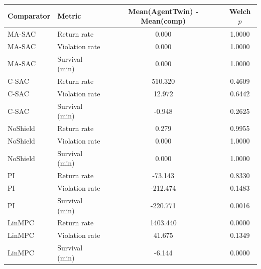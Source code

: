 \begin{tabular}{llcc}
\toprule
Comparator & Metric & Mean(AgentTwin) - Mean(comp) & Welch $p$\\
\midrule
MA-SAC & Return rate & 0.000 & 1.0000\\
MA-SAC & Violation rate & 0.000 & 1.0000\\
MA-SAC & Survival (min) & 0.000 & 1.0000\\
C-SAC & Return rate & 510.320 & 0.4609\\
C-SAC & Violation rate & 12.972 & 0.6442\\
C-SAC & Survival (min) & -0.948 & 0.2625\\
NoShield & Return rate & 0.279 & 0.9955\\
NoShield & Violation rate & 0.000 & 1.0000\\
NoShield & Survival (min) & 0.000 & 1.0000\\
PI & Return rate & -73.143 & 0.8330\\
PI & Violation rate & -212.474 & 0.1483\\
PI & Survival (min) & -220.771 & 0.0016\\
LinMPC & Return rate & 1403.440 & 0.0000\\
LinMPC & Violation rate & 41.675 & 0.1349\\
LinMPC & Survival (min) & -6.144 & 0.0000\\
\bottomrule
\end{tabular}